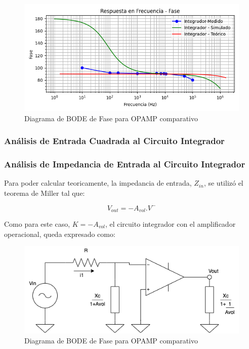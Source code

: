 \begin{figure}[H]
    \centering 
    \includegraphics [scale=1] {../Ejercicio3-CircuitoIntegradoresyDerivadores/Imagenes/entrada-senoidal-fase.png} 
    \caption{Diagrama de BODE de Fase para OPAMP comparativo }
    \label{fig:emptyPlotTool}
\end{figure}

\subsubsection{Análisis de Entrada Cuadrada al Circuito Integrador}


\subsubsection{Análisis de Impedancia de Entrada al Circuito Integrador}

Para poder calcular teoricamente, la impedancia de entrada, $Z_{in}$, se utilizó el teorema de Miller tal que:

$$ V_{out}=-A_{vol}.V^-$$

Como para este caso, $K=-A_{vol}$, el circuito integrador con el amplificador operacional, queda expresado como:

\begin{figure}[H]
    \centering 
    \includegraphics [scale=0.7] {../Ejercicio3-CircuitoIntegradoresyDerivadores/Imagenes/miller-integrador.png} 
    \caption{Diagrama de BODE de Fase para OPAMP comparativo }
    \label{fig:emptyPlotTool}
\end{figure}


